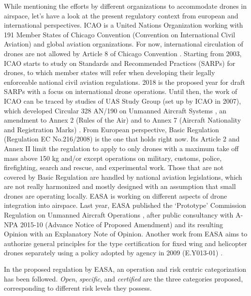 While mentioning the efforts by different organizations to accommodate drones in airspace, let's have a look at the present regulatory context from european and international perspectives.
ICAO is a United Nations Organization working with 191 Member States of Chicago Convention (Convention on International Civil Aviation) and global aviation organizations. 
For now, international circulation of drones are not allowed by Article 8 of Chicago Convention \cite{chicagoConvention}. 
Starting from 2003, ICAO starts to study on Standards and Recommended Practices (SARPs) for drones, to which member states will refer when developing their legally enforceable national civil aviation regulations. 
2018 is the proposed year for draft SARPs with a focus on international drone operations. 
Until then, the work of ICAO can be traced by studies of UAS Study Group (set up by ICAO in 2007), which developed Circular 328 AN/190 on Unmanned Aircraft Systems \cite{ICAO_Circular}, an amendment to Annex 2 (Rules of the Air) \cite{amendment43toAnnex2} and to Annex 7 (Aircraft Nationality and Registration Marks) \cite{amendment6toAnnex6}.
From European perspective, Basic Regulation (Regulation EC No.216/2008) \cite{basicRegulation} is the one that holds right now. 
Its Article 2 and Annex II limit the regulation to apply to only drones with a maximum take off mass above 150 kg and/or except operations on military, customs, police, firefighting, search and rescue, and experimental work. 
Those that are not covered by Basic Regulation are handled by national aviation legislations, which are not really harmonized and mostly designed with an assumption that small drones are operating locally.
EASA is working on different aspects of drone integration into airspace. 
Last year, EASA published the `Prototype' Commission Regulation on Unmanned Aircraft Operations \cite{prototypeRegulation}, after public consultancy with A-NPA 2015-10 (Advance Notice of Proposed Amendment) \cite{A_NPA_EASA2015} and its resulting Opinion \cite{technicalOpinion} with an Explanatory Note of Opinion. 
Another work from EASA aims to authorize general principles for the type certification for fixed wing and helicopter drones separately using a policy adopted by agency in 2009 (E.Y013-01) \cite{EY013_01policyStatementAirworthinessCertification}.

In the proposed regulation by EASA, an operation and risk centric categorization has been followed. 
\emph{Open}, \emph{specific}, and \emph{certified} are the three categories proposed, corresponding to different risk levels they possess.

